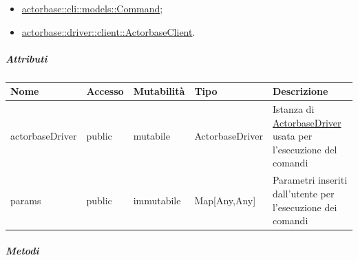 \documentclass{scalatekids-article}
\begin{document}
\begin{itemize}
\item \hyperref[sec:actorbase::cli::models::Command]{actorbase::cli::models::Command};
\item \hyperref[sec:actorbase::driver::client::ActorbaseClient]{actorbase::driver::client::ActorbaseClient}.
\end{itemize}

\subparagraph{Attributi}

\begin{tabular}{| p{2.5cm} | p{1.5cm} | p{2cm} | p{2.5cm} | p{8.5cm} |}
  \hline
  Nome & Accesso & Mutabilità & Tipo & Descrizione\\
  \hline
  actorbaseDriver & public & mutabile & ActorbaseDriver & Istanza di \hyperref[sec:actorbase::driver::]{ActorbaseDriver} usata per l'esecuzione del comandi\\
  \hline
  params & public & immutabile & Map[Any,Any] & Parametri inseriti dall'utente per l'esecuzione dei comandi\\
  \hline
\end{tabular}

\subparagraph{Metodi}
\end{document}
